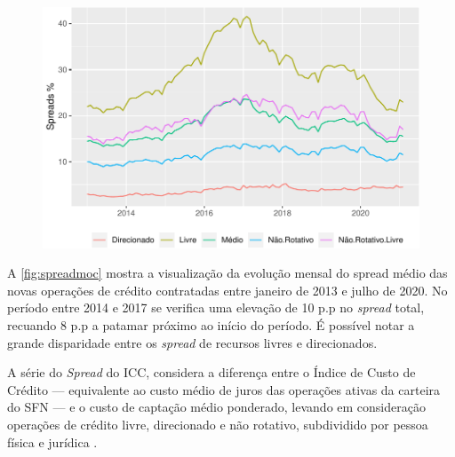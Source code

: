 \documentclass[12pt,12pt,openright,oneside,a4paper,chapter=TITLE,section=TITLE,subsection=TITLE,subsubsection=TITLE,english,french,spanish,portugues,sumario=tradicional]{abntex2}
\begin{document}
\begin{figure}

\begin{center}\includegraphics{12-exportedfigures/spread 2019 moc-1} \end{center}
\label{fig:spreadmoc}
\end{figure}

A \autoref{fig:spreadmoc} mostra a visualização da evolução mensal do spread
médio das novas operações de crédito contratadas entre janeiro de 2013 e julho
de 2020. No período entre 2014 e 2017 se verifica uma elevação de 10 p.p no
\emph{spread} total, recuando 8 p.p a patamar próximo ao início do período. É possível notar a grande disparidade entre os \emph{spread} de recursos livres e direcionados.

A série do \emph{Spread} do ICC, considera a diferença entre o Índice de Custo de
Crédito --- equivalente ao custo médio de juros das operações ativas da carteira
do SFN --- e o custo de captação médio ponderado, levando em consideração
operações de crédito livre, direcionado e não rotativo, subdividido por pessoa
física e jurídica \cite{BCB:2016}.
\end{document}
